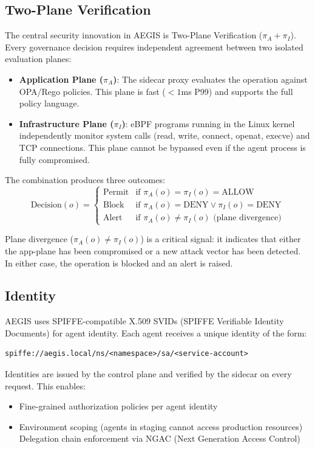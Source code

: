 \documentclass[runningheads]{llncs}
\begin{document}
\subsection{Two-Plane Verification}
\label{sec:twoplane}

The central security innovation in AEGIS is Two-Plane Verification ($\pi_A + \pi_I$). Every governance decision requires independent agreement between two isolated evaluation planes:

\begin{itemize}
\item \textbf{Application Plane ($\pi_A$)}: The sidecar proxy evaluates the operation against OPA/Rego policies. This plane is fast ($<1$ms P99) and supports the full policy language.
\item \textbf{Infrastructure Plane ($\pi_I$)}: eBPF programs running in the Linux kernel independently monitor system calls (read, write, connect, openat, execve) and TCP connections. This plane cannot be bypassed even if the agent process is fully compromised.
\end{itemize}

The combination produces three outcomes:
\begin{equation*}
\text{Decision}(o) = \begin{cases}
\text{Permit} & \text{if } \pi_A(o) = \pi_I(o) = \text{ALLOW} \\
\text{Block} & \text{if } \pi_A(o) = \text{DENY} \lor \pi_I(o) = \text{DENY} \\
\text{Alert} & \text{if } \pi_A(o) \neq \pi_I(o) \text{ (plane divergence)}
\end{cases}
\end{equation*}

Plane divergence ($\pi_A(o) \neq \pi_I(o)$) is a critical signal: it indicates that either the app-plane has been compromised or a new attack vector has been detected. In either case, the operation is blocked and an alert is raised.

\subsection{Identity}

AEGIS uses SPIFFE-compatible X.509 SVIDs (SPIFFE Verifiable Identity Documents) for agent identity. Each agent receives a unique identity of the form:
\begin{lstlisting}
spiffe://aegis.local/ns/<namespace>/sa/<service-account>
\end{lstlisting}
Identities are issued by the control plane and verified by the sidecar on every request. This enables:
\begin{itemize}
\item Fine-grained authorization policies per agent identity
\item Environment scoping (agents in staging cannot access production resources)
\tightitem Delegation chain enforcement via NGAC (Next Generation Access Control)
\end{itemize}
\end{document}
